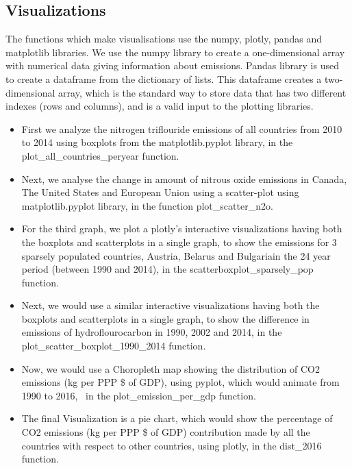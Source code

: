 \documentclass[a4paper, 11pt]{report}
\begin{document}
\subsection{Visualizations}

The functions which make visualisations use the numpy, plotly, pandas and matplotlib libraries.
We use the numpy library to create a one-dimensional array with numerical data giving information about emissions. Pandas library is used to create a dataframe from the dictionary of lists. This dataframe creates a two-dimensional array, which is the standard way to store data that has two different indexes (rows and columns), and is a valid input to the plotting libraries. \\

\begin{itemize}
    \item First we analyze the  nitrogen triflouride emissions of all countries from 2010 to 2014 using boxplots from the matplotlib.pyplot library, in the plot\_all\_countries\_peryear function.\\

    \item  Next, we analyse the change in amount of nitrous oxide emissions in Canada, The United States and European Union using a scatter-plot using matplotlib.pyplot library, in the function plot\_scatter\_n2o.\\

    \item For the third graph, we plot a plotly's interactive visualizations having both the boxplots and scatterplots in a single graph, to show the emissions for 3 sparsely populated countries, Austria, Belarus and Bulgariain the 24 year period (between 1990 and 2014), in the scatterboxplot\_sparsely\_pop function.\\

    \item Next, we would use a similar interactive visualizations having both the boxplots and scatterplots in a single graph, to show the difference in emissions of hydroflourocarbon in 1990, 2002 and 2014, in the plot\_scatter\_boxplot\_1990\_2014 function.\\

    \item Now, we would use a Choropleth map showing the distribution of CO2 emissions (kg per PPP \$ of GDP), using pyplot, which would animate from 1990 to 2016,~ in the plot\_emission\_per\_gdp function.\\

    \item The final Visualization is a pie chart, which would show the percentage of CO2 emissions (kg per PPP \$ of GDP) contribution made by all the countries with respect to other countries, using plotly, in the dist\_2016 function.\\
\end{itemize}
\end{document}
